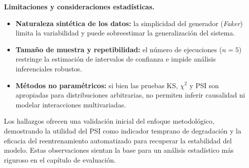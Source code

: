 \textbf{Limitaciones y consideraciones estadísticas.}
\begin{itemize}
    \item \textbf{Naturaleza sintética de los datos:} la simplicidad del generador (\textit{Faker}) limita la variabilidad y puede sobreestimar la generalización del sistema.
    \item \textbf{Tamaño de muestra y repetibilidad:} el número de ejecuciones ($n=5$) restringe la estimación de intervalos de confianza e impide análisis inferenciales robustos.
    \item \textbf{Métodos no paramétricos:} si bien las pruebas KS, $\chi^2$ y PSI son apropiadas para distribuciones arbitrarias, no permiten inferir causalidad ni modelar interacciones multivariadas.
\end{itemize}

Los hallazgos ofrecen una validación inicial del enfoque metodológico, demostrando la utilidad del PSI como indicador temprano de degradación y la eficacia del reentrenamiento automatizado para recuperar la estabilidad del modelo. Estas observaciones sientan la base para un análisis estadístico más riguroso en el capítulo de evaluación.
